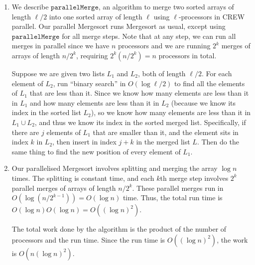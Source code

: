 \documentclass[12 pt, letterpaper]{hmcpset}
\begin{document}
\begin{solution}
	\begin{enumerate}
		\item We describe $\mathtt{parallelMerge}$, an algorithm to merge two sorted arrays of length $\ell / 2$ into one sorted array of length $\ell$ using $\ell$-processors in CREW parallel. Our parallel Mergesort runs Mergesort as usual, except using $\mathtt{parallelMerge}$ for all merge steps. Note that at any step, we can run all merges in parallel since we have $n$ processors and we are running $2^{k}$ merges of arrays of length $n / 2^{k}$, requiring $2^{k} (n / 2^{k}) = n$ processors in total.

			Suppose we are given two lists $L_{1}$ and $L_{2}$, both of length $\ell / 2$. For each element of $L_{2}$, run ``binary search'' in $O(\log \ell / 2)$ to find all the elements of $L_{1}$ that are less than it. Since we know how many elements are less than it in $L_{1}$ and how many elements are less than it in $L_{2}$ (because we know its index in the sorted list $L_{2}$), so we know how many elements are less than it in $L_{1} \cup L_{2}$, and thus we know its index in the sorted merged list. Specifically, if there are $j$ elements of $L_{1}$ that are smaller than it, and the element sits in index $k$ in $L_{2}$, then insert in index $j + k$ in the merged list $L$. Then do the same thing to find the new position of every element of $L_{1}$.

		\item Our parallelised Mergesort involves splitting and merging the array $\log n$ times. The splitting is constant time, and each $k$th merge step involves $2^{k}$ parallel merges of arrays of length  $n / 2^{k}$. These parallel merges run in $O(\log(n / 2^{k - 1})) = O(\log n)$ time. Thus, the total run time is  $O(\log n) O(\log n) = O((\log n)^{2})$. 

			The total work done by the algorithm is the product of the number of processors and the run time. Since the run time is $O((\log n)^{2})$, the work is $O(n (\log n)^{2})$.
	\end{enumerate}
\end{solution}
\end{document}
